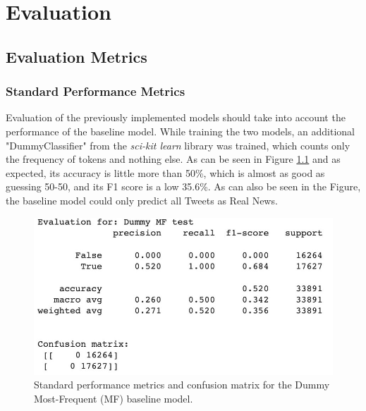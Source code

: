 \documentclass{l4proj}
\begin{document}
\clearpage

\chapter{Evaluation}
\label{chap:eval}


\section{Evaluation Metrics}

\subsection{Standard Performance Metrics}

Evaluation of the previously implemented models should take into account the performance of the baseline model. While training the two models, an additional "DummyClassifier" from the \textit{sci-kit learn} library was trained, which counts only the frequency of tokens and nothing else. As can be seen in Figure \ref{fig:DummyModel} and as expected, its accuracy is little more than 50\%, which is almost as good as guessing 50-50, and its F1 score is a low 35.6\%. As can also be seen in the Figure, the baseline model could only predict all Tweets as Real News.

\begin{figure}
    \centering
    \includegraphics[width=0.8\linewidth]{images/Evaluation/DummyMostFrequentCrop.jpg}    

    \caption{Standard performance metrics and confusion matrix for the Dummy Most-Frequent (MF) baseline model.}
    \label{fig:DummyModel} 
\end{figure}
\end{document}
